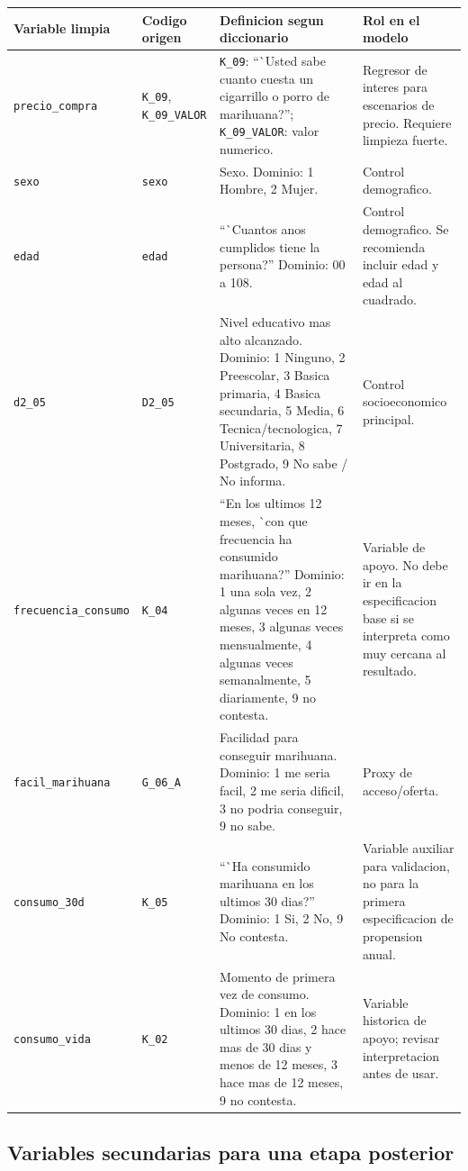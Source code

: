 \documentclass[11pt]{article}
\begin{document}
\begin{longtable}{p{3cm} p{2.2cm} p{5.8cm} p{4.5cm}}
\toprule
Variable limpia & Codigo origen & Definicion segun diccionario & Rol en el modelo \\
\midrule
\endhead
\texttt{precio\_compra} & \texttt{K\_09}, \texttt{K\_09\_VALOR} & \texttt{K\_09}: ``\`{ }Usted sabe cuanto cuesta un cigarrillo o porro de marihuana?''; \texttt{K\_09\_VALOR}: valor numerico. & Regresor de interes para escenarios de precio. Requiere limpieza fuerte. \\
\texttt{sexo} & \texttt{sexo} & Sexo. Dominio: 1 Hombre, 2 Mujer. & Control demografico. \\
\texttt{edad} & \texttt{edad} & ``\`{ }Cuantos anos cumplidos tiene la persona?'' Dominio: 00 a 108. & Control demografico. Se recomienda incluir edad y edad al cuadrado. \\
\texttt{d2\_05} & \texttt{D2\_05} & Nivel educativo mas alto alcanzado. Dominio: 1 Ninguno, 2 Preescolar, 3 Basica primaria, 4 Basica secundaria, 5 Media, 6 Tecnica/tecnologica, 7 Universitaria, 8 Postgrado, 9 No sabe / No informa. & Control socioeconomico principal. \\
\texttt{frecuencia\_consumo} & \texttt{K\_04} & ``En los ultimos 12 meses, \`{ }con que frecuencia ha consumido marihuana?'' Dominio: 1 una sola vez, 2 algunas veces en 12 meses, 3 algunas veces mensualmente, 4 algunas veces semanalmente, 5 diariamente, 9 no contesta. & Variable de apoyo. No debe ir en la especificacion base si se interpreta como muy cercana al resultado. \\
\texttt{facil\_marihuana} & \texttt{G\_06\_A} & Facilidad para conseguir marihuana. Dominio: 1 me seria facil, 2 me seria dificil, 3 no podria conseguir, 9 no sabe. & Proxy de acceso/oferta. \\
\texttt{consumo\_30d} & \texttt{K\_05} & ``\`{ }Ha consumido marihuana en los ultimos 30 dias?'' Dominio: 1 Si, 2 No, 9 No contesta. & Variable auxiliar para validacion, no para la primera especificacion de propension anual. \\
\texttt{consumo\_vida} & \texttt{K\_02} & Momento de primera vez de consumo. Dominio: 1 en los ultimos 30 dias, 2 hace mas de 30 dias y menos de 12 meses, 3 hace mas de 12 meses, 9 no contesta. & Variable historica de apoyo; revisar interpretacion antes de usar. \\
\bottomrule
\end{longtable}

\subsection{Variables secundarias para una etapa posterior}
\end{document}
